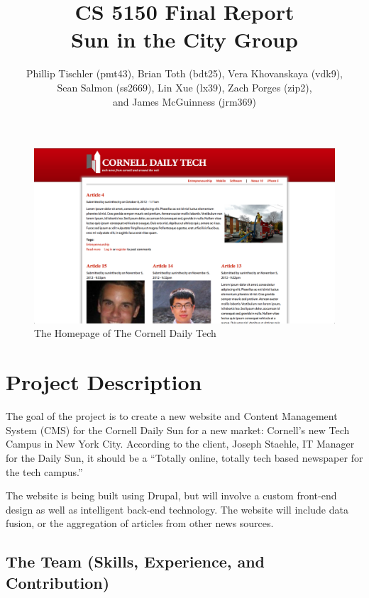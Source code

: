 \documentclass[11pt]{article} %
\title{CS 5150 Final Report \\ Sun in the City Group}
\author{Phillip Tischler (pmt43), Brian Toth (bdt25), Vera Khovanskaya (vdk9), \\ 
Sean Salmon (ss2669), Lin Xue (lx39), Zach Porges (zip2),  \\
and James McGuinness (jrm369)}
\begin{document}
\maketitle


\begin{figure}[h!]
\begin{center}
\includegraphics[width=\columnwidth]{images/homepage}
\end{center}
\caption{The Homepage of The Cornell Daily Tech}
\end{figure}

\clearpage
\tableofcontents
\clearpage

\section{Project Description}

The goal of the project is to create a new website and Content Management System (CMS) for the Cornell Daily Sun for a new market: Cornell’s new Tech Campus in New York City. According to the client, Joseph Staehle, IT Manager for the Daily Sun, it should be a ``Totally online, totally tech based newspaper for the tech campus.”

The website is being built using Drupal, but will involve a custom front-end design as well as intelligent back-end technology. The website will include data fusion, or the aggregation of articles from other news sources.

\subsection{The Team (Skills, Experience, and Contribution)}
\end{document}
